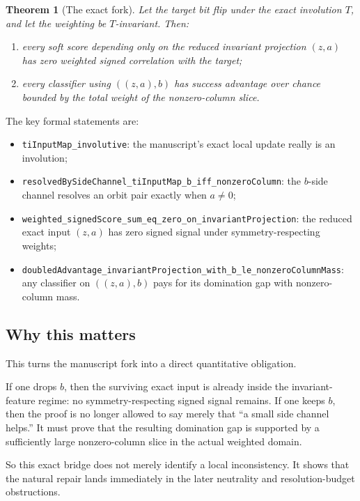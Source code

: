\documentclass[11pt]{article}
\newtheorem{theorem}{Theorem}[section]
\theoremstyle{remark}
\begin{document}
\begin{theorem}[The exact fork]
Let the target bit flip under the exact involution \(T\), and let the weighting be \(T\)-invariant.
Then:
\begin{enumerate}[leftmargin=1.5em]
  \item every soft score depending only on the reduced invariant projection \((z,a)\) has zero
  weighted signed correlation with the target;
  \item every classifier using \(((z,a),b)\) has success advantage over chance bounded by the
  total weight of the nonzero-column slice.
\end{enumerate}
\end{theorem}

\noindent
The key formal statements are:
\begin{itemize}[leftmargin=1.5em]
  \item \texttt{tiInputMap\_involutive}: the manuscript's exact local update really is an
  involution;
  \item \texttt{resolvedBySideChannel\_tiInputMap\_b\_iff\_nonzeroColumn}: the \(b\)-side channel
  resolves an orbit pair exactly when \(a \neq 0\);
  \item \texttt{weighted\_signedScore\_sum\_eq\_zero\_on\_invariantProjection}: the reduced exact
  input \((z,a)\) has zero signed signal under symmetry-respecting weights;
  \item \texttt{doubledAdvantage\_invariantProjection\_with\_b\_le\_nonzeroColumnMass}: any
  classifier on \(((z,a),b)\) pays for its domination gap with nonzero-column mass.
\end{itemize}

\subsection{Why this matters}

This turns the manuscript fork into a direct quantitative obligation.

If one drops \(b\), then the surviving exact input is already inside the invariant-feature regime:
no symmetry-respecting signed signal remains.  If one keeps \(b\), then the proof is no longer
allowed to say merely that ``a small side channel helps.''  It must prove that the resulting
domination gap is supported by a sufficiently large nonzero-column slice in the actual weighted
domain.

So this exact bridge does not merely identify a local inconsistency.  It shows that the natural
repair lands immediately in the later neutrality and resolution-budget obstructions.
\end{document}
